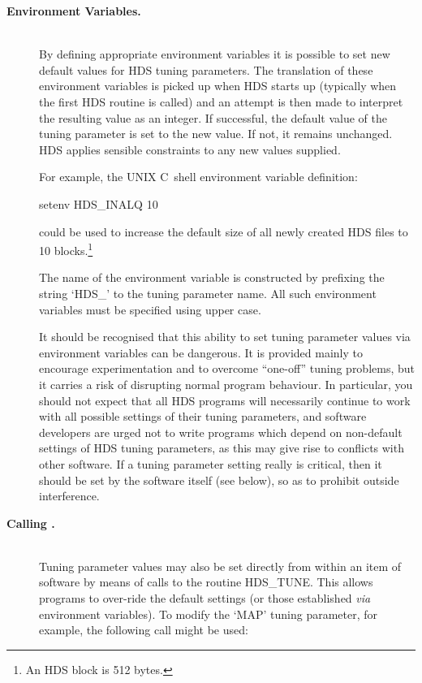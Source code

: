 \documentclass[twoside,11pt]{starlink}
\providecommand{\qt}[1]{``#1''}
\providecommand{\st}[1]{{\emph{#1}}}
\begin{document}
\begin{description}

\item[\textbf{Environment Variables.}]\mbox{}\\
By defining appropriate environment variables it is possible to set
new default values for HDS tuning parameters. The translation of these
environment variables is picked up when HDS starts up (typically when
the first HDS routine is called) and an attempt is then made to
interpret the resulting value as an integer. If successful, the
default value of the tuning parameter is set to the new value. If not,
it remains unchanged. HDS applies sensible constraints to any new
values supplied.

For example, the UNIX C~shell environment variable definition:

\begin{small}
\begin{terminalv}
setenv HDS_INALQ 10
\end{terminalv}
\end{small}

could be used to increase the default size of all newly created HDS
files to 10 blocks.\footnote{An HDS block is 512 bytes.}

The name of the environment variable is constructed by prefixing the
string `HDS\_' to the tuning parameter name. All such environment
variables must be specified using upper case.

It should be recognised that this ability to set tuning parameter
values via environment variables can be dangerous. It is provided
mainly to encourage experimentation and to overcome \qt{one-off}
tuning problems, but it carries a risk of disrupting normal program
behaviour. In particular, you should not expect that all HDS programs
will necessarily continue to work with all possible settings of their
tuning parameters, and software developers are urged not to write
programs which depend on non-default settings of HDS tuning
parameters, as this may give rise to conflicts with other software. If
a tuning parameter setting really is critical, then it should be set
by the software itself (see below), so as to prohibit outside
interference.

\item[\textbf{Calling .}]\mbox{}\\
Tuning parameter values may also be set directly from within an item
of software by means of calls to the routine HDS\_TUNE. This allows
programs to over-ride the default settings (or those established
\st{via} environment variables). To modify the `MAP' tuning parameter,
for example, the following call might be used:


\end{description}
\end{document}
